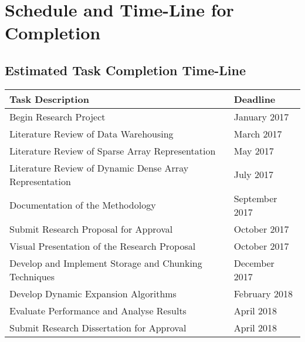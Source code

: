 %
%
%
%
%
\chapter{Schedule and Time-Line for Completion} \label{chap:schedule}


\section{Estimated Task Completion Time-Line}

\begin{tabular}{|l|l|}
	\hline 
	\textbf{Task Description} & \textbf{Deadline} \\ 
	\hline 
	 Begin Research Project & January 2017\\
	 Literature Review of Data Warehousing & March 2017\\
	 Literature Review of Sparse Array Representation & May 2017\\
	 Literature Review of Dynamic Dense Array Representation & July 2017\\
	 Documentation of the Methodology & September 2017\\
	 Submit Research Proposal for Approval & October 2017\\
	 Visual Presentation of the Research Proposal & October 2017 \\
	 Develop and Implement Storage and Chunking Techniques & December 2017\\
	 Develop Dynamic Expansion Algorithms & February 2018\\
	 Evaluate Performance and Analyse Results & April 2018\\
	 Submit Research Dissertation for Approval & April 2018\\
	\hline 
\end{tabular} 